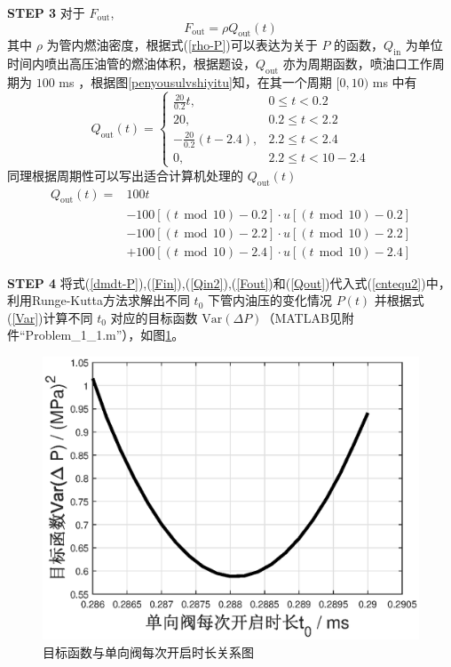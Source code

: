 \documentclass[12pt,a4paper]{article}
\begin{document}
\textbf{\songti STEP 3} 对于 $F_{\text{out}}$,
\begin{equation}
\label{Fout}
F_{\text{out}}=\rho Q_{\text{out}}(t)
\end{equation}
其中 $\rho$ 为管内燃油密度，根据式(\ref{rho-P})可以表达为关于 $P$ 的函数，$Q_{\text{in}}$ 为单位时间内喷出高压油管的燃油体积，根据题设，$Q_{\text{out}}$ 亦为周期函数，喷油口工作周期为 $100$ ms ，根据图\ref{penyousulvshiyitu}知，在其一个周期 $[0,10)$ ms 中有
\begin{equation}
Q_{\text{out}}(t)=\left\{\begin{array}{ll}
\frac{20}{0.2}t,&0\leq t<0.2\\
20,&0.2\leq t<2.2\\
-\frac{20}{0.2}(t-2.4),&2.2\leq t<2.4\\
0,&2.2\leq t<10-2.4
\end{array}\right.
\end{equation}
同理根据周期性可以写出适合计算机处理的 $Q_{\text{out}}(t)$
\begin{align}
\nonumber Q_{\text{out}}(t)=&100t\\
\nonumber&-100[(t~~\text{mod}~~10)-0.2]\cdot u[(t~~\text{mod}~~10)-0.2]\\
\nonumber&-100[(t~~\text{mod}~~10)-2.2]\cdot u[(t~~\text{mod}~~10)-2.2]\\
\label{Qout}&+100[(t~~\text{mod}~~10)-2.4]\cdot u[(t~~\text{mod}~~10)-2.4]
\end{align}

\textbf{\songti STEP 4} 将式(\ref{dmdt-P}),(\ref{Fin}),(\ref{Qin2}),(\ref{Fout})和(\ref{Qout})代入式(\ref{cntequ2})中，利用Runge-Kutta方法求解出不同 $t_0$ 下管内油压的变化情况 $P(t)$ 并根据式(\ref{Var})计算不同 $t_0$ 对应的目标函数 $\text{Var}(\Delta P)$（MATLAB见附件“Problem\_1\_1.m”），如图\ref{Problem_1_1}。
\begin{figure}[h]
\centering
\includegraphics[scale=0.75]{Problem_1_1.eps}
\caption{目标函数与单向阀每次开启时长关系图}\label{Problem_1_1}
\end{figure}
\end{document}
